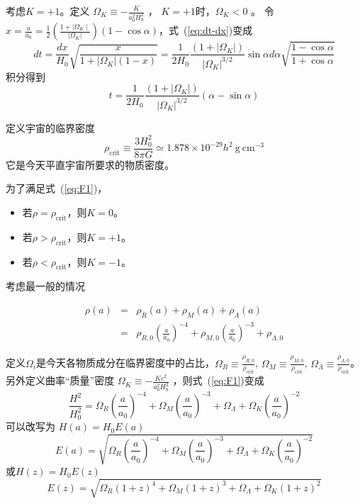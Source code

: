 \documentclass[]{ctexart}
\newcommand{\refeq}[1]{式~(\ref{#1})}
\begin{document}
考虑$K=+1$。定义 $\Omega_K \equiv -\frac{K}{a_0^2 H_0^2}$ ， $K=+1$时，$\Omega_K <0$ 。
令 $x=\frac{a}{a_{0}}=\frac{1}{2}\left(\frac{1+| \Omega_{K} \mid}{\left|\Omega_{K}\right|}\right)(1-\cos \alpha)$，\refeq{eq:dt-dx}变成
\begin{equation}
    d t=\frac{d x}{H_{0}} \sqrt{\frac{x}{1+\left|\Omega_{K}\right|(1-x)}}=\frac{1}{2 H_{0}} \frac{\left(1+\left|\Omega_{K}\right|\right)}{\left|\Omega_{K}\right|^{3 / 2}} \sin \alpha d \alpha \sqrt{\frac{1-\cos \alpha}{1+ \cos  \alpha}}
\end{equation}
积分得到
\begin{equation}
    t=\frac{1}{2 H_{0}} \frac{\left(1+\left|\Omega_{K}\right|\right)}{\left|\Omega_{K}\right|^{3 / 2}}(\alpha-\sin \alpha)
\end{equation}

定义宇宙的临界密度
\begin{equation}
    \rho_\text{crit} \equiv \frac{3H_0^2}{8\pi G} \simeq 1.878\times 10^{-29} h^2 \mathrm{~g~cm^{-3}}
\end{equation}
它是今天平直宇宙所要求的物质密度。


为了满足\refeq{eq:F1}，
\begin{itemize}
    \item 若$\rho=\rho_\text{crit}$，则$K=0$。
    \item 若$\rho>\rho_\text{crit}$，则$K=+1$。
    \item 若$\rho<\rho_\text{crit}$，则$K=-1$。
\end{itemize}

考虑最一般的情况

\begin{eqnarray}
    \rho(a) &=& \rho_R(a) + \rho_M(a) + \rho_\Lambda (a) \label{eq:rho}
    \\ &=& \rho_{R,0}\left(\frac{a}{a_0}\right)^{-4} + \rho_{M,0}\left(\frac{a}{a_0}\right)^{-3}  + \rho_{\Lambda,0}     
\end{eqnarray}

定义$\Omega_i$是今天各物质成分在临界密度中的占比，$\Omega_R\equiv\frac{\rho_{R,0}}{\rho_\text{crit}}$, $\Omega_M\equiv\frac{\rho_{M,0}}{\rho_\text{crit}}$, $\Omega_\Lambda\equiv\frac{\rho_{\Lambda,0}}{\rho_\text{crit}}$。
另外定义曲率“质量”密度 $\Omega_K \equiv -\frac{K c^2}{a_0^2 H_0^2}$ ，则\refeq{eq:F1}变成
\begin{equation}
    \frac{H^2}{H_0^2} = \Omega_R \left(\frac{a}{a_0}\right)^{-4} + \Omega_M \left(\frac{a}{a_0}\right)^{-3} + \Omega_\Lambda + \Omega_K \left(\frac{a}{a_0}\right)^{-2}
\end{equation}
可以改写为 $H(a)=H_0 E(a)$
\begin{equation}
    E(a) = \sqrt{ \Omega_R \left(\frac{a}{a_0}\right)^{-4} + \Omega_M \left(\frac{a}{a_0}\right)^{-3} + \Omega_\Lambda + \Omega_K \left(\frac{a}{a_0}\right)^{-2} }
\end{equation}
或$H(z)=H_0 E(z)$
\begin{equation}
    E(z) = \sqrt{ \Omega_R \left(1+z\right)^{4} + \Omega_M \left(1+z\right)^{3} + \Omega_\Lambda + \Omega_K \left(1+z\right)^{2} }
\end{equation}
\end{document}
